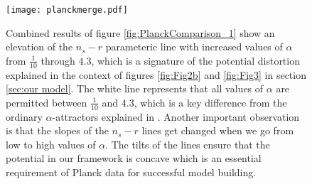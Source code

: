 \documentclass[a4paper,11pt]{article}
\begin{document}
\begin{figure}[H]
	\centering
	\texttt{[image: planckmerge.pdf]}
	\caption{Combined results of figure \ref{fig:PlanckComparison_1} show an elevation of the $n_s-r$ parameteric line with increased values of $\alpha$ from $\frac{1}{10}$ through $4.3$, which is a signature of the potential distortion explained in the context of figures \ref{fig:Fig2b} and \ref{fig:Fig3} in section \ref{sec:our model}. The white line represents that all values of $\alpha$ are permitted between $\frac{1}{10}$ and $4.3$, which is a key difference from the ordinary $\alpha$-attractors explained in \cite{Sarkar:2021ird}. Another important observation is that the slopes of the $n_s-r$ lines get changed when we go from low to high values of $\alpha$. The tilts of the lines ensure that the potential in our framework is concave which is an essential requirement of Planck data for successful model building.}
	\label{fig:PlanckComparison_2}
\end{figure}
\end{document}
